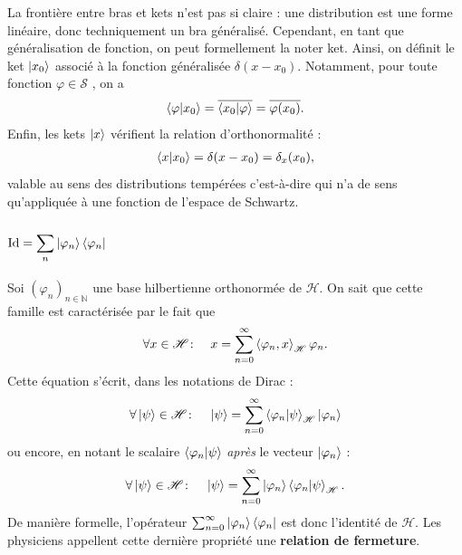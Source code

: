 La frontière entre \guillemotleft{}bras\guillemotright{} et \guillemotleft{}kets\guillemotright{} n'est pas si claire : une distribution est une forme linéaire, donc techniquement un bra généralisé. Cependant, en tant que généralisation de fonction, on peut \textendash\textendash{} formellement \textendash\textendash{} la noter ket. Ainsi, on définit le ket $\ket{x_0}$ associé à la  \guillemotleft{} fonction généralisée \guillemotright{} $\delta ( x - x_0)$. Notamment, pour toute fonction $\varphi \in \mathscr S$ , on a 
\begin{eqnarray}
    \braket{\varphi \vert x_0} = \overline{\braket{x_0 \vert \varphi}} = \overline{\varphi(x_0)}.
\end{eqnarray}
Enfin, les kets $\ket{x}$ vérifient la relation d'orthonormalité :
\begin{eqnarray}
    \braket{x \vert x_0} = \delta ( x - x_0)  = \delta_x ( x_0),
\end{eqnarray}
valable au sens des distributions tempérées \textendash\textendash{} c'est-à-dire qui n'a de sens qu'appliquée à une fonction de l'espace de Schwartz.

\subsubsection{\guillemotleft{}$ \displaystyle\mathrm{Id} = \sum_n \ket{\varphi_n } \bra{ \varphi_n}$\guillemotright{}}

Soi $(\varphi_n)_{n\in \mathbb N}$ une base hilbertienne orthonormée de $\mathscr H$. On sait que cette famille est caractérisée par le fait que 
\begin{eqnarray}
    \forall x \in \mathscr H \colon \quad x = \sum_{n =0}^\infty \braket{\varphi_n , x }_{\mathscr H} \varphi_n.
\end{eqnarray}
Cette équation s'écrit, dans les notations de Dirac :
\begin{eqnarray}
    \forall \ket{\psi} \in \mathscr H \colon \quad \ket{\psi} = \sum_{n =0}^\infty \braket{\varphi_n \vert \psi }_{\mathscr H} \ket{\varphi_n}
\end{eqnarray}
ou encore, en notant le scalaire $\braket{\varphi_n \vert  \psi }$ {\em après} le vecteur $\ket{\varphi_n}$ :
\begin{eqnarray}
    \forall \ket{\psi} \in \mathscr H \colon \quad \ket{\psi} = \sum_{n =0}^\infty \ket{\varphi_n}\braket{\varphi_n \vert \psi }_{\mathscr H}.
\end{eqnarray}
De manière formelle, l'opérateur $\sum_{n = 0}^{\infty} \ket{\varphi_n}\bra{\varphi_n}$ est donc l'identité de $\mathscr H$. Les physiciens appellent cette dernière propriété une {\bf relation de fermeture}.

